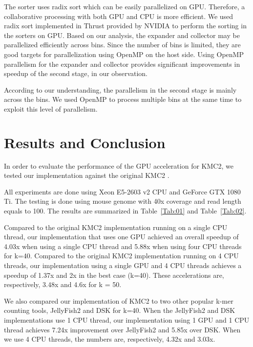 \documentclass{bioinfo}
\begin{document}
The sorter uses radix sort which can be easily parallelized on GPU.
Therefore, a collaborative processing with both GPU and CPU is more efficient.
We used radix sort implemented in Thrust \citep{Jared} provided by NVIDIA to perform the 
sorting in the sorters on GPU.
Based on our analysis, the expander and collector may be parallelized efficiently across bins.
Since the number of bins is limited, they are good targets for parallelization using OpenMP on 
the host side. Using OpenMP parallelism for the expander and collector provides significant 
improvements in speedup of the second stage, in our observation.

According to our understanding, the parallelism in the second stage is mainly across the bins.
We used OpenMP to process multiple bins at the same time to exploit this level of parallelism.


\section{Results and Conclusion}
In order to evaluate the performance of the GPU acceleration for KMC2, we tested our
implementation against the original KMC2 \citep{Seb14}.

All experiments are done using Xeon E5-2603 v2 CPU and GeForce GTX 1080 Ti.
The testing is done using mouse genome with 40x coverage and read length equals to 100.
The results are summarized in Table~\ref{Tab:01} and Table~\ref{Tab:02}.

Compared to the original KMC2 implementation \citep{Seb14} running on a single CPU thread, 
our implementation that uses one GPU achieved an overall speedup of 4.03x when using a single 
CPU thread and 5.88x when using four CPU threads for k=40. Compared to the original KMC2 
implementation \citep{Seb14} running on 4 CPU threads, our implementation using a single GPU and 4 
CPU threads achieves a speedup of 1.37x and 2x in the best case (k=40). These accelerations are, 
respectively, 3.48x and 4.6x for k = 50.

We also compared our implementation of KMC2 to two other popular k-mer counting tools, JellyFish2 
and DSK for k=40. When the JellyFish2 and DSK implementations use 1 CPU thread, our implementation 
using 1 GPU and 1 CPU thread achieves 7.24x improvement over JellyFish2 and 5.85x over DSK. When we 
use 4 CPU threads, the numbers are, respectively, 4.32x and 3.03x. 
\end{document}
